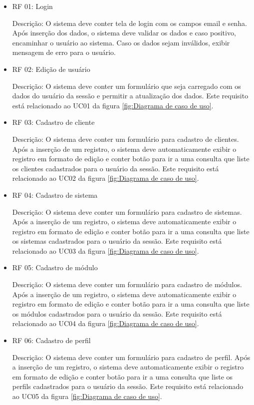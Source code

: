 \begin{itemize}
	
	
\item RF 01: Login


Descrição: O sistema deve conter tela de login com os campos email e senha. Após inserção dos dados, o sistema deve validar os dados e caso positivo, encaminhar o usuário ao sistema. Caso os dados sejam inválidos, exibir mensagem de erro para o usuário.


\item RF 02: Edição de usuário


Descrição: O sistema deve conter um formulário que seja carregado com os dados do usuário da sessão e permitir a atualização dos dados. Este requisito está relacionado ao UC01 da figura \ref{fig:Diagrama de caso de uso}.


\item RF 03: Cadastro de cliente


Descrição: O sistema deve conter um formulário para cadastro de clientes. Após a inserção de um registro, o sistema deve automaticamente exibir o registro em formato de edição e conter botão para ir a uma consulta que liste os clientes cadastrados para o usuário da sessão. Este requisito está relacionado ao UC02 da figura \ref{fig:Diagrama de caso de uso}.


\item RF 04: Cadastro de sistema


Descrição: O sistema deve conter um formulário para cadastro de sistemas. Após a inserção de um registro, o sistema deve automaticamente exibir o registro em formato de edição e conter botão para ir a uma consulta que liste os sistemas cadastrados para o usuário da sessão. Este requisito está relacionado ao UC03 da figura \ref{fig:Diagrama de caso de uso}.


\item RF 05: Cadastro de módulo


Descrição: O sistema deve conter um formulário para cadastro de módulos. Após a inserção de um registro, o sistema deve automaticamente exibir o registro em formato de edição e conter botão para ir a uma consulta que liste os módulos cadastrados para o usuário da sessão. Este requisito está relacionado ao UC04 da figura \ref{fig:Diagrama de caso de uso}.


\item RF 06: Cadastro de perfil


Descrição: O sistema deve conter um formulário para cadastro de perfil. Após a inserção de um registro, o sistema deve automaticamente exibir o registro em formato de edição e conter botão para ir a uma consulta que liste os perfils cadastrados para o usuário da sessão. Este requisito está relacionado ao UC05 da figura \ref{fig:Diagrama de caso de uso}.\linebreak



\end{itemize}
